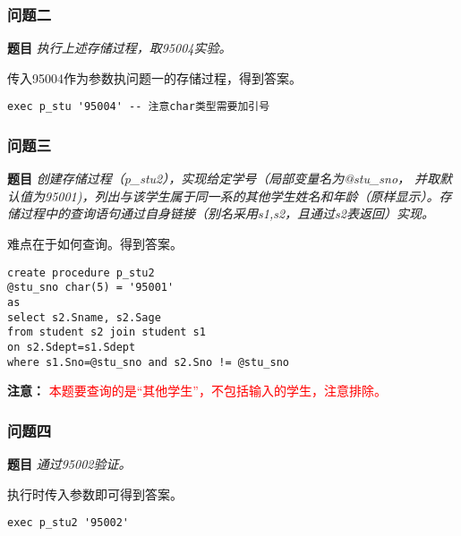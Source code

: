 \subsubsection{问题二}

\textbf{题目} \emph{执行上述存储过程，取95004实验。}

\vspace{6pt}

\qquad 传入95004作为参数执问题一的存储过程，得到答案。

\begin{mdframed}[backgroundcolor=blue!5]
\begin{verbatim}
exec p_stu '95004' -- 注意char类型需要加引号
\end{verbatim}
\end{mdframed}

\subsubsection{问题三}

\textbf{题目} \emph{创建存储过程（p\_stu2），实现给定学号（局部变量名为@stu\_sno， 并取默认值为95001)，列出与该学生属于同一系的其他学生姓名和年龄（原样显示）。存储过程中的查询语句通过自身链接（别名采用s1,s2，且通过s2表返回）实现。}

\vspace{6pt}

\qquad 难点在于如何查询。得到答案。

\begin{mdframed}[backgroundcolor=blue!5]
\begin{verbatim}
create procedure p_stu2
@stu_sno char(5) = '95001'
as
select s2.Sname, s2.Sage
from student s2 join student s1
on s2.Sdept=s1.Sdept
where s1.Sno=@stu_sno and s2.Sno != @stu_sno
\end{verbatim}
\end{mdframed}

\qquad \textbf{注意：} \textcolor{red}{本题要查询的是“其他学生”，不包括输入的学生，注意排除。}

\subsubsection{问题四}

\textbf{题目} \emph{通过95002验证。}

\vspace{6pt}

\qquad 执行时传入参数即可得到答案。

\begin{mdframed}[backgroundcolor=blue!5]
\begin{verbatim}
exec p_stu2 '95002'
\end{verbatim}
\end{mdframed}

